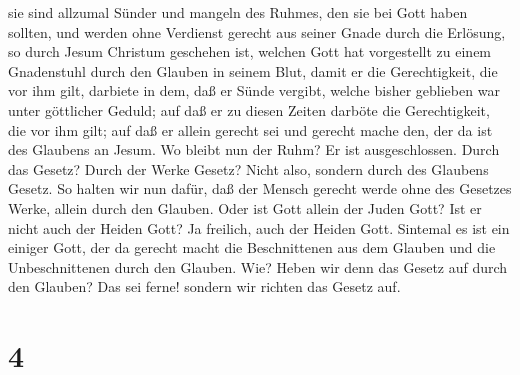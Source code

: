 sie sind allzumal Sünder und mangeln des Ruhmes, den sie bei Gott haben
sollten,  und werden ohne Verdienst gerecht aus seiner
Gnade durch die Erlösung, so durch Jesum Christum geschehen ist,
 welchen Gott hat vorgestellt zu einem Gnadenstuhl durch
den Glauben in seinem Blut, damit er die Gerechtigkeit, die vor ihm
gilt, darbiete in dem, daß er Sünde vergibt, welche bisher geblieben war
unter göttlicher Geduld;  auf daß er zu diesen Zeiten
darböte die Gerechtigkeit, die vor ihm gilt; auf daß er allein gerecht
sei und gerecht mache den, der da ist des Glaubens an Jesum.
 Wo bleibt nun der Ruhm? Er ist ausgeschlossen. Durch das
Gesetz? Durch der Werke Gesetz? Nicht also, sondern durch des Glaubens
Gesetz.  So halten wir nun dafür, daß der Mensch gerecht
werde ohne des Gesetzes Werke, allein durch den Glauben. 
Oder ist Gott allein der Juden Gott? Ist er nicht auch der Heiden Gott?
Ja freilich, auch der Heiden Gott.  Sintemal es ist ein
einiger Gott, der da gerecht macht die Beschnittenen aus dem Glauben und
die Unbeschnittenen durch den Glauben.  Wie? Heben wir denn
das Gesetz auf durch den Glauben? Das sei ferne! sondern wir richten das
Gesetz auf.

\hypertarget{section-3}{%
\section{4}\label{section-3}}

